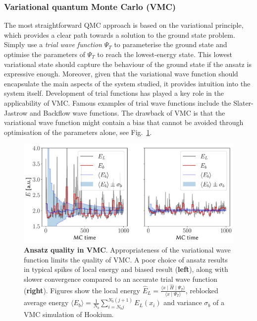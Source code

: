 \subsubsection{Variational quantum Monte Carlo (VMC)}
\label{sec:vmc}
The most straightforward QMC approach is based on the variational principle, which provides a clear path towards a solution to the ground state problem. Simply use a \emph{trial wave function} $\Psi_{T}$ to parameterise the ground state and optimise the parameters of $\Psi_{T}$ to reach the lowest-energy state. This lowest variational state should capture the behaviour of the ground state if the ansatz is expressive enough. Moreover, given that the variational wave function should encapsulate the main aspects of the system studied, it provides intuition into the system itself. Development of trial functions has played a key role in the applicability of VMC. Famous examples of trial wave functions include the Slater-Jastrow and Backflow wave functions. The drawback of VMC is that the variational wave function might contain a bias that cannot be avoided through optimisation of the parameters alone, see Fig.~\ref{fig:qmc_blocking}. 
\begin{figure}[h]
	\centering
	\includegraphics[width=\linewidth]{Chapter2/Figs/Vector/blocking}
	\caption[Ansatz quality in VMC]{\textbf{Ansatz quality in VMC}. Appropriateness of the variational wave function limits the quality of VMC. A poor choice of ansatz results in typical spikes of local energy  and biased result (\textbf{left}), along with slower convergence compared to an accurate trial wave function (\textbf{right}). Figures show the local energy $\hat E_L = \frac{\langle x\mid\hat{H}\mid \Psi_{T}\rangle}{\langle x \mid \Psi_{T}\rangle}$, reblocked average energy $\langle E_b \rangle =\frac{1}{N_{b}} \sum_{i=N_bj}^{N_b(j+1)} E_{L}(x_i)$ and variance $\sigma_b$ of a VMC simulation of Hookium.}
	\label{fig:qmc_blocking}
\end{figure}
